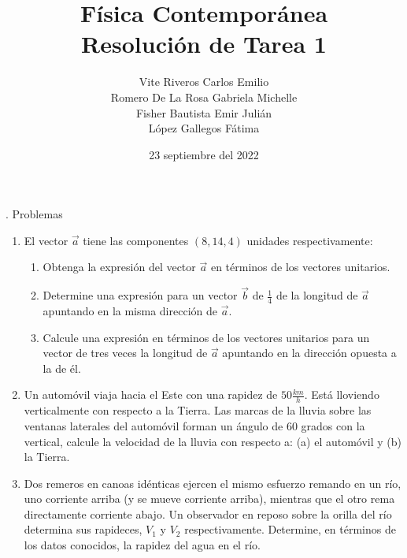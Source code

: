 \documentclass[10pt, a4paper]{article}
\title{Física Contemporánea\\Resolución de Tarea 1}
\author{Vite Riveros Carlos Emilio\\ Romero De La Rosa Gabriela Michelle\\ 
        Fisher Bautista Emir Julián\\ López Gallegos Fátima}
\date{23 septiembre del 2022}
\begin{document}
    . Problemas
    \begin{enumerate}
        \item El vector $\vec{a}$ tiene las componentes $(8, 14, 4)$ unidades respectivamente:
        
        \begin{center}
        \end{center}
        
       \begin{enumerate}
            \item Obtenga la expresión del vector $\vec{a}$ en términos de los vectores unitarios.
            \item Determine una expresión para un vector $\vec{b}$ de $\frac{1}{4}$ de la longitud de $\vec{a}$ 
            apuntando en la misma dirección de $\vec{a}$.
            \item Calcule una expresión en términos de los vectores unitarios para un vector de
            tres veces la longitud de $\vec{a}$ apuntando en la dirección opuesta a la de él.
       \end{enumerate}
       \item Un automóvil viaja hacia el Este con una rapidez de $50 \si{\frac{km}{h}}$. Está lloviendo
       verticalmente con respecto a la Tierra. Las marcas de la lluvia sobre las ventanas
       laterales del automóvil forman un ángulo de 60 grados con la vertical, calcule la
       velocidad de la lluvia con respecto a: (a) el automóvil y (b) la Tierra.
       \item Dos remeros en canoas idénticas ejercen el mismo esfuerzo remando en un río,
       uno corriente arriba (y se mueve corriente arriba), mientras que el otro rema
       directamente corriente abajo. Un observador en reposo sobre la orilla del río
       determina sus rapideces, $V_1$ y $V_2$ respectivamente. Determine, en términos de
       los datos conocidos, la rapidez del agua en el río.
    \end{enumerate}
\end{document}
